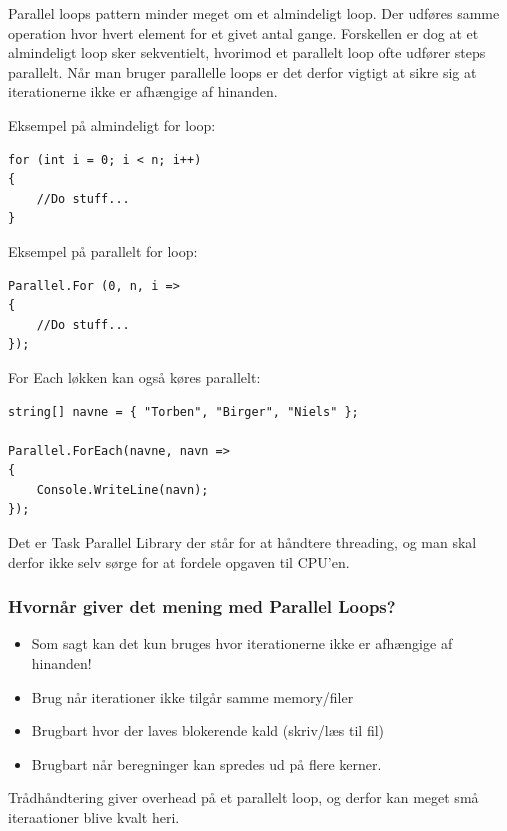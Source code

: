 Parallel loops pattern minder meget om et almindeligt loop. Der udføres samme operation hvor hvert element for et givet antal gange. Forskellen er dog at et almindeligt loop sker sekventielt, hvorimod et parallelt loop ofte udfører steps parallelt. Når man bruger parallelle loops er det derfor vigtigt at sikre sig at iterationerne ikke er afhængige af hinanden.

Eksempel på almindeligt for loop:

\begin{lstlisting}[caption=Normal for loop, label=code:normalLoop]
for (int i = 0; i < n; i++)
{
	//Do stuff...
}
\end{lstlisting}

Eksempel på parallelt for loop:

\begin{lstlisting}[caption=Parallel for loop,  label=code:paraLoop,
morekeywords={Parallel, For}]
Parallel.For (0, n, i =>
{
	//Do stuff...
});
\end{lstlisting}

For Each løkken kan også køres parallelt:

\begin{lstlisting}[caption=Parallelt for each loop, label=paraForEach]
string[] navne = { "Torben", "Birger", "Niels" };

Parallel.ForEach(navne, navn =>
{
	Console.WriteLine(navn);
});
\end{lstlisting}

Det er Task Parallel Library der står for at håndtere threading, og man skal derfor ikke selv sørge for at fordele opgaven til CPU'en. 

\subsubsection{Hvornår giver det mening med Parallel Loops?}
\begin{itemize}
	\item Som sagt kan det kun bruges hvor iterationerne ikke er afhængige af hinanden!
	\item Brug når iterationer ikke tilgår samme memory/filer
	\item Brugbart hvor der laves blokerende kald (skriv/læs til fil)
	\item Brugbart når beregninger kan spredes ud på flere kerner.
\end{itemize}

Trådhåndtering giver overhead på et parallelt loop, og derfor kan meget små iteraationer blive kvalt heri.

